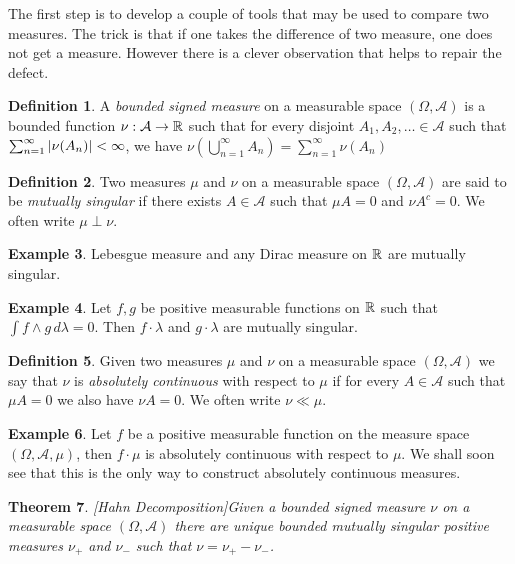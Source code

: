 \documentclass{amsart}
\newtheorem{thm}{Theorem}[section]
\theoremstyle{remark}
\theoremstyle{definition}
\newtheorem{defn}[thm]{Definition}
\newtheorem{examp}[thm]{Example}
\begin{document}
The first step is to develop a couple of tools that may be used to
compare two measures.  The trick is that if one takes the difference
of two measure, one does not get a measure.  However there is a clever
observation that helps to repair the defect.  
\begin{defn}A \emph{ bounded signed measure} on a measurable space $(\Omega,
  \mathcal{A})$ is a bounded function $\nu : \mathcal{A} \to
  \mathbb{R}$ such that for every disjoint $A_1, A_2, \dots \in
  \mathcal{A}$ such that $\sum_{n=1}^\infty \left \vert \nu (A_n) \right \vert  < \infty$, we have $\nu(\bigcup_{n=1}^\infty A_n ) =
  \sum_{n=1}^\infty \nu (A_n)$ 
\end{defn}
\begin{defn}Two measures $\mu$ and $\nu$ on a measurable space $(\Omega,
  \mathcal{A})$ are said to be \emph{mutually singular} if there
  exists $A \in \mathcal{A}$ such that $\mu A = 0$ and $\nu A^c = 0$.
  We often write $\mu \perp \nu$.
\end{defn}
\begin{examp}Lebesgue measure and any Dirac measure on $\mathbb{R}$ are
  mutually singular.
\end{examp}
\begin{examp}Let $f,g$ be positive measurable functions on $\mathbb{R}$
  such that $\int f \wedge g \, d\lambda= 0$.  Then $f \cdot \lambda$ and $g
  \cdot \lambda$ are mutually singular.
\end{examp}
\begin{defn}Given two measures $\mu$ and $\nu$ on a measurable space $(\Omega,
  \mathcal{A})$ we say that $\nu$ is \emph{absolutely continuous} with
  respect to $\mu$ if for every $A \in \mathcal{A}$ such that $\mu A =
  0 $ we also have $\nu A = 0$.
  We often write $\nu \ll \mu$.
\end{defn}
\begin{examp}Let $f$ be a positive measurable function on the measure
  space $(\Omega,
  \mathcal{A}, \mu)$, then $f \cdot \mu$ is absolutely continuous with
  respect to $\mu$.  We shall soon see that this is the only way to
  construct absolutely continuous measures.
\end{examp}
\begin{thm}\label{HahnDecomposition}[Hahn Decomposition]Given a
  bounded signed measure $\nu$ on a measurable space $(\Omega,
  \mathcal{A})$ there are unique bounded mutually singular positive
  measures $\nu_+$ and $\nu_-$ such that $\nu = \nu_+ - \nu_-$.
\end{thm}
\end{document}

